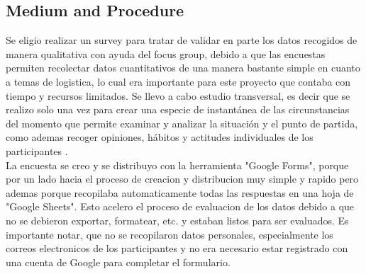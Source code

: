 \subsection{Medium and Procedure}
Se eligio realizar un survey para tratar de validar en parte los datos recogidos de manera qualitativa con ayuda del focus group, debido a que las encuestas permiten recolectar datos cuantitativos de una manera bastante simple en cuanto a temas de logistica, lo cual era importante para este proyecto que contaba con tiempo y recursos limitados. Se llevo a cabo estudio transversal, es decir que se realizo solo una vez para crear una especie de instantánea de las circunstancias del momento que permite examinar y analizar la situación y el punto de partida, como ademas recoger opiniones, hábitos y actitudes individuales de los participantes \cite{usabilityUXBook}. \\
La encuesta se creo y se distribuyo con la herramienta "Google Forms", porque por un lado hacia el proceso de creacion y distribucion muy simple y rapido pero ademas porque recopilaba automaticamente todas las respuestas en una hoja de "Google Sheets". Esto acelero el proceso de evaluacion de los datos debido a que no se debieron exportar, formatear, etc. y estaban listos para ser evaluados. Es importante notar, que no se recopilaron datos personales, especialmente los correos electronicos de los participantes y no era necesario estar registrado con una cuenta de Google para completar el formulario.\\


